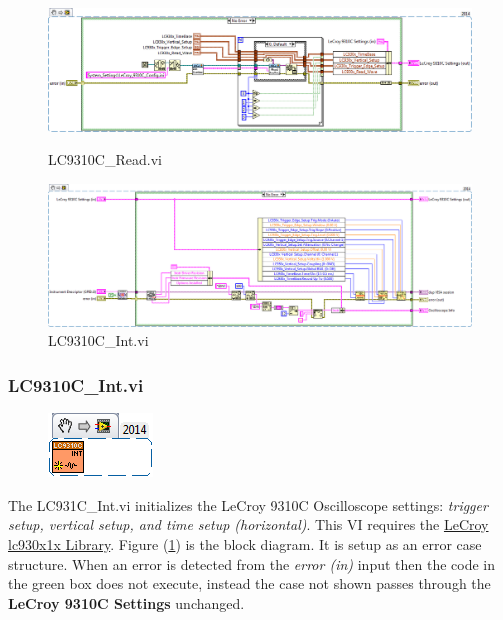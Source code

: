 \documentclass[11pt,a4paper,oldfontcommands]{memoir}
\begin{document}
\begin{figure}
	\includegraphics[width=\textheight,keepaspectratio]{LC931C_Read_blockdiagram}
	\caption{LC9310C\_Read.vi}
	\label{fig:LC9310C_Read_blkdig}
	\includegraphics[width=\textheight,keepaspectratio]{LC931C_Int_blockdiagram}
	\caption{LC9310C\_Int.vi}
	\label{fig:LC9310C_Int_blkdig}
\end{figure}

\subsubsection{LC9310C\_Int.vi} \label{LC9310C_Int}
\noindent\hrulefill

\begin{figure}[h]
	\includegraphics[scale=0.625]{LC931C_Int_main_02}
	\label{fig:LC9310C_Int_main_02}
\end{figure}

The LC931C\_Int.vi initializes the LeCroy 9310C Oscilloscope settings: \textit{trigger setup, vertical setup, and time setup (horizontal)}. This VI requires the \href{http://sine.ni.com/apps/utf8/niid_web_display.download_page?p_id_guid=E3B19B3E9608659CE034080020E74861}{LeCroy lc930x1x Library}. Figure (\ref{fig:LC9310C_Int_blkdig}) is the block diagram.  It is setup as an error case structure. When an error is detected from the \textit{error (in)} input then the code in the green box does not execute, instead the case not shown passes through the \textbf{LeCroy 9310C Settings} unchanged.
\end{document}
